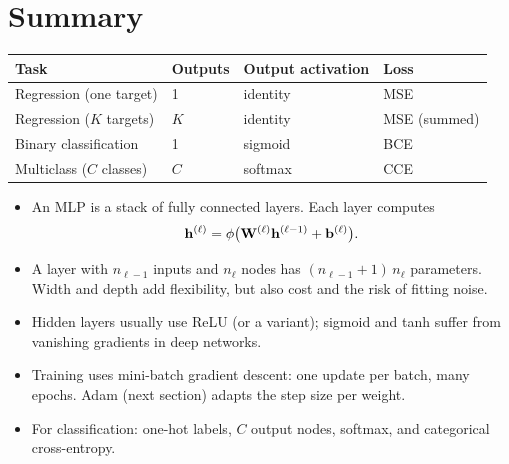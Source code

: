 \documentclass[12pt, a4paper]{article}
\begin{document}
\section{Summary}

\begin{center}
  \renewcommand{\arraystretch}{1.35}
  \begin{tabular}{llll}
    \toprule
    Task                     & Outputs & Output activation & Loss         \\
    \midrule
    Regression (one target)  & 1       & identity          & MSE          \\
    Regression ($K$ targets) & $K$     & identity          & MSE (summed) \\
    Binary classification    & 1       & sigmoid           & BCE          \\
    Multiclass ($C$ classes) & $C$     & softmax           & CCE          \\
    \bottomrule
  \end{tabular}
\end{center}

\begin{itemize}
  \item An MLP is a stack of fully connected layers. Each layer computes
        \[\mathbf{h}^{(\ell)} = \phi\bigl(\mathbf{W}^{(\ell)} \mathbf{h}^{(\ell-1)} + \mathbf{b}^{(\ell)}\bigr).\]
  \item A layer with $n_{\ell-1}$ inputs and $n_\ell$ nodes has
        $(n_{\ell-1}+1)\,n_\ell$ parameters. Width and depth add flexibility,
        but also cost and the risk of fitting noise.
  \item Hidden layers usually use ReLU (or a variant); sigmoid and tanh suffer
        from vanishing gradients in deep networks.
  \item Training uses mini-batch gradient descent: one update per batch, many
        epochs. Adam (next section) adapts the step size per weight.
  \item For classification: one-hot labels, $C$ output nodes, softmax, and
        categorical cross-entropy.
\end{itemize}
\end{document}
